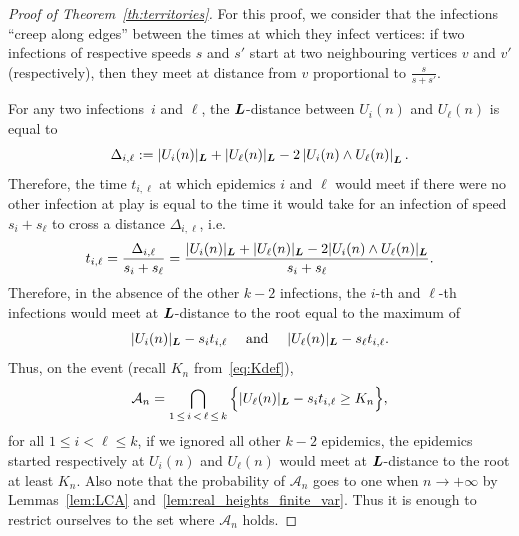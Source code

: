\documentclass[AHL,Unicode,longabstracts,published]{cedram}
\newcommand{\bs}{\ensuremath{\boldsymbol}}
\newcommand{\clA}{\mathcal{A}}
\begin{document}
\begin{proof}[Proof of Theorem~\ref{th:territories}]
For this proof, we consider that the infections ``creep along edges'' between the times at which they infect vertices: if two infections of respective speeds $s$ and $s'$ start at two neighbouring vertices $v$ and $v'$ (respectively), then they meet at distance from $v$ proportional to $\frac s{s+s'}$.

For any two infections~$i$ and $\ell$, the $\bs L$-distance between $U_i(n)$ and $U_\ell(n)$ is equal to
\[
\Delta_{i,\ell} := |U_i(n)|_{\bs L}+|U_\ell(n)|_{\bs L}-2\left|U_i(n)\wedge U_\ell(n)\right|_{\bs L}.
\]
Therefore, the time $t_{i,\ell}$ at which epidemics $i$ and $\ell$ would meet if there were no other infection at play is equal to the time it would take for an infection of speed $s_i+s_\ell$ to cross a distance $\Delta_{i,\ell}$, i.e.
\begin{equation}\label{eq:til}
t_{i,\ell} = \frac{\Delta_{i,\ell}}{s_i+s_\ell} = \frac{|U_i(n)|_{\bs L}+|U_\ell(n)|_{\bs L}-2|U_i(n)\wedge U_\ell(n)|_{\bs L}}{s_i+s_\ell}.
\end{equation}
Therefore, in the absence of the other $k-2$ infections, the $i$-th and $\ell$-th infections would meet at $\bs L$-distance to the root equal to the maximum of
\begin{equation}\label{eq:meeting}
|U_i(n)|_{\bs L} - s_i t_{i,\ell} \quad\text{ and }\quad |U_\ell(n)|_{\bs L} - s_\ell t_{i,\ell}.
\end{equation}
Thus, on the event (recall $K_n$ from~\eqref{eq:Kdef}),
\[
\clA_n = \bigcap_{1\,\leq\,i\,<\,\ell\,\leq\,k}\Big\{|U_\ell(n)|_{\bs L} - s_i t_{i,\ell}\geq K_n\Big\},
\]
for all $1\leq i<\ell\leq k$, if we ignored all other $k-2$ epidemics, the epidemics started respectively at $U_i(n)$ and $U_\ell(n)$ would meet at $\bs L$-distance to the root at least $K_n$. Also note that the probability of $\clA_n$ goes to one when $n\to+\infty$ by Lemmas~\ref{lem:LCA} and~\ref{lem:real_heights_finite_var}. Thus it is enough to restrict ourselves to the set where $\clA_n$ holds.



\end{proof}
\end{document}
